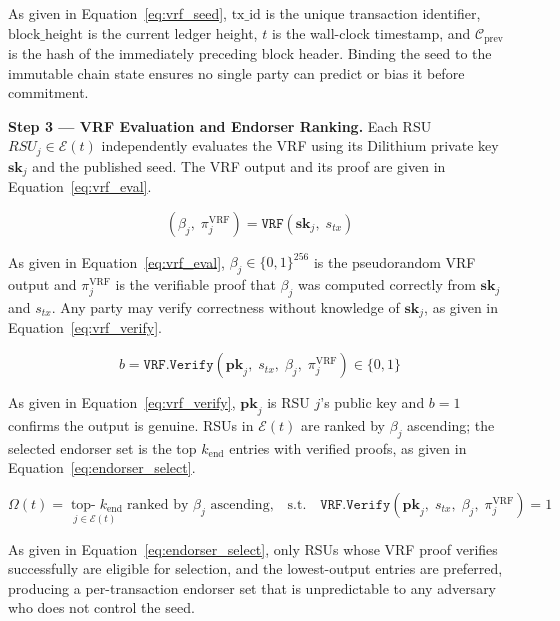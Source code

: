 \documentclass[12pt, a4paper]{report}
\newcommand{\mypar}{\vspace{0.8em}\noindent}
\begin{document}
As given in Equation~\eqref{eq:vrf_seed}, $\text{tx\_id}$ is the
unique transaction identifier, $\text{block\_height}$ is the
current ledger height, $t$ is the wall-clock timestamp, and
$\mathcal{C}_{\text{prev}}$ is the hash of the immediately
preceding block header. Binding the seed to the immutable chain
state ensures no single party can predict or bias it before
commitment.

\mypar
\textbf{Step 3 — VRF Evaluation and Endorser Ranking.}
Each RSU $RSU_j \in \mathcal{E}(t)$ independently evaluates the
VRF using its Dilithium private key $\mathbf{sk}_j$ and the
published seed. The VRF output and its proof are given in
Equation~\eqref{eq:vrf_eval}.

\begin{equation}
\label{eq:vrf_eval}
(\beta_j,\;\pi_j^{\text{VRF}}) =
\texttt{VRF}(\mathbf{sk}_j,\; s_{tx})
\end{equation}

As given in Equation~\eqref{eq:vrf_eval}, $\beta_j \in
\{0,1\}^{256}$ is the pseudorandom VRF output and
$\pi_j^{\text{VRF}}$ is the verifiable proof that
$\beta_j$ was computed correctly from $\mathbf{sk}_j$ and
$s_{tx}$. Any party may verify correctness without knowledge
of $\mathbf{sk}_j$, as given in
Equation~\eqref{eq:vrf_verify}.

\begin{equation}
\label{eq:vrf_verify}
b =
\texttt{VRF.Verify}
\!\left(
\mathbf{pk}_j,\;
s_{tx},\;
\beta_j,\;
\pi_j^{\text{VRF}}
\right)
\in \{0,1\}
\end{equation}

As given in Equation~\eqref{eq:vrf_verify}, $\mathbf{pk}_j$ is
RSU $j$'s public key and $b = 1$ confirms the output is genuine.
RSUs in $\mathcal{E}(t)$ are ranked by $\beta_j$ ascending; the
selected endorser set is the top $k_{\text{end}}$ entries with
verified proofs, as given in Equation~\eqref{eq:endorser_select}.

\begin{equation}
\label{eq:endorser_select}
\Omega(t) =
\underset{j \in \mathcal{E}(t)}
{\operatorname{top-}k_{\text{end}}}
\;\text{ranked by } \beta_j \text{ ascending,}
\quad
\text{s.t.}
\quad
\texttt{VRF.Verify}
\!\left(
\mathbf{pk}_j,\; s_{tx},\;
\beta_j,\; \pi_j^{\text{VRF}}
\right) = 1
\end{equation}

As given in Equation~\eqref{eq:endorser_select}, only RSUs whose
VRF proof verifies successfully are eligible for selection,
and the lowest-output entries are preferred, producing a
per-transaction endorser set that is unpredictable to any
adversary who does not control the seed.
\end{document}
